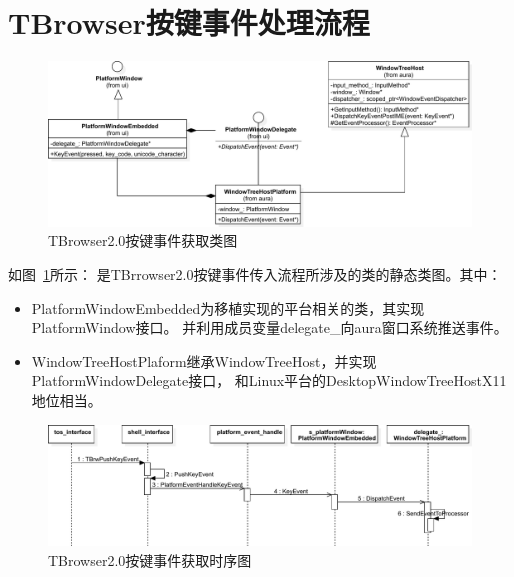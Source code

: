 \documentclass[12pt]{article}
\begin{document}

\section{TBrowser按键事件处理流程}

\begin{figure}[H] 
  \centering 
  \includegraphics[width=\textwidth]{image/tbrowser_event_source_class.pdf} 
  \caption{TBrowser2.0按键事件获取类图} \label{fig:tbrowser_event_source_class} 
\end{figure}

如图~\ref{fig:tbrowser_event_source_class}所示：
是TBrrowser2.0按键事件传入流程所涉及的类的静态类图。其中：
\begin{itemize}
  \item PlatformWindowEmbedded为移植实现的平台相关的类，其实现PlatformWindow接口。
  并利用成员变量delegate\_向aura窗口系统推送事件。
  \item WindowTreeHostPlaform继承WindowTreeHost，并实现PlatformWindowDelegate接口，
  和Linux平台的DesktopWindowTreeHostX11地位相当。
\end{itemize}

\newpage
\begin{figure}[H] 
  \centering 
  \includegraphics[width=\textwidth]{image/tbrowser_get_event_from_source.pdf} 
  \caption{TBrowser2.0按键事件获取时序图} \label{fig:tbrowser_get_event_from_source} 
\end{figure}
\end{document}
